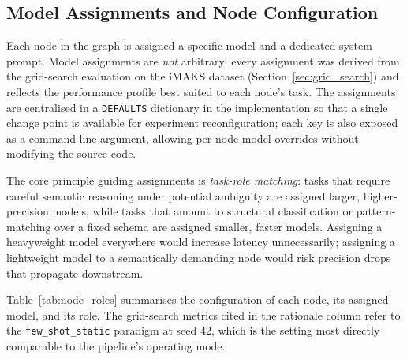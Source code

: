 ﻿\documentclass[11pt]{article}
\begin{document}
\subsection{Model Assignments and Node Configuration}
\label{sec:agent_config}

Each node in the graph is assigned a specific model and a dedicated system prompt.
Model assignments are \emph{not} arbitrary: every assignment was derived from the
grid-search evaluation on the iMAKS dataset (Section~\ref{sec:grid_search}) and
reflects the performance profile best suited to each node's task.  The assignments
are centralised in a \texttt{DEFAULTS} dictionary in the implementation so that
a single change point is available for experiment reconfiguration; each key is also
exposed as a command-line argument, allowing per-node model overrides without
modifying the source code.

The core principle guiding assignments is \emph{task-role matching}: tasks that
require careful semantic reasoning under potential ambiguity are assigned larger,
higher-precision models, while tasks that amount to structural classification or
pattern-matching over a fixed schema are assigned smaller, faster models.
Assigning a heavyweight model everywhere would increase latency unnecessarily;
assigning a lightweight model to a semantically demanding node would risk precision
drops that propagate downstream.

Table~\ref{tab:node_roles} summarises the configuration of each node, its assigned
model, and its role.  The grid-search metrics cited in the rationale column refer
to the \texttt{few\_shot\_static} paradigm at seed 42, which is the setting most
directly comparable to the pipeline's operating mode.
\end{document}
